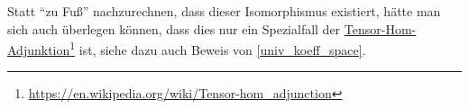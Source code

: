 Statt \enquote{zu Fuß} nachzurechnen, dass dieser Isomorphismus existiert, hätte man sich auch überlegen können, dass dies nur ein Spezialfall der \href{https://en.wikipedia.org/wiki/Tensor-hom_adjunction}{Tensor-Hom-Adjunktion}\footnote{\url{https://en.wikipedia.org/wiki/Tensor-hom_adjunction}} ist, siehe dazu auch Beweis von \autoref{univ_koeff_space}.










